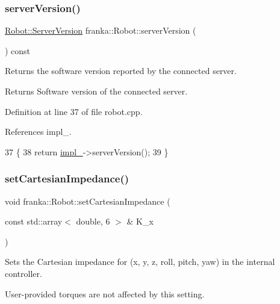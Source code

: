 \subsubsection{\texorpdfstring{server\+Version()}{serverVersion()}}
{\footnotesize\ttfamily \hyperlink{classfranka_1_1Robot_ad1dd3dccff6f33691d2c66eaa5ac5a10}{Robot\+::\+Server\+Version} franka\+::\+Robot\+::server\+Version (\begin{DoxyParamCaption}{ }\end{DoxyParamCaption}) const\hspace{0.3cm}{\ttfamily [noexcept]}}

Returns the software version reported by the connected server.

\begin{DoxyReturn}{Returns}
Software version of the connected server. 
\end{DoxyReturn}


Definition at line 37 of file robot.\+cpp.



References impl\+\_\+.


\begin{DoxyCode}
37                                                        \{
38   \textcolor{keywordflow}{return} \hyperlink{classfranka_1_1Robot_aca155054184e5b6478942fd6a1b82ba4}{impl\_}->serverVersion();
39 \}
\end{DoxyCode}
\mbox{\label{classfranka_1_1Robot_ac2678c5c31cc8c0627ecda7485f81f6d}} 
\subsubsection{\texorpdfstring{set\+Cartesian\+Impedance()}{setCartesianImpedance()}}
{\footnotesize\ttfamily void franka\+::\+Robot\+::set\+Cartesian\+Impedance (\begin{DoxyParamCaption}\item[{const std\+::array$<$ double, 6 $>$ \&}]{K\+\_\+x }\end{DoxyParamCaption})}

Sets the Cartesian impedance for (x, y, z, roll, pitch, yaw) in the internal controller.

User-\/provided torques are not affected by this setting.


